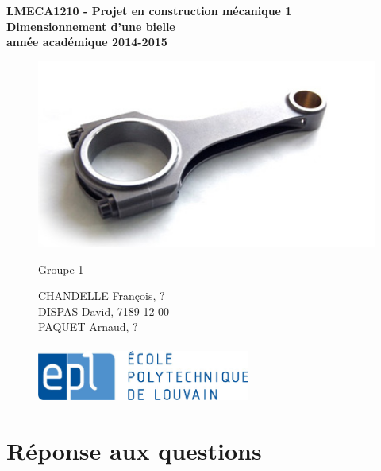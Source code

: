 \documentclass[a4paper,oneside,12pt]{report}
\begin{document}
\begin{titlepage}
\hfill

\begin{center}
\Huge
\textbf{LMECA1210 - Projet en construction mécanique 1\\}
\vspace{0.5cm}
\huge
\textbf{Dimensionnement d'une bielle\\}
\Large
\vspace{0.5cm}
\textbf{année académique 2014-2015\\}
\vspace{0.5cm}
\begin{figure}[b!]
	\center
	\includegraphics[width=12cm]{bielle.jpg}
\end{figure}

\end{center}
\begin{figure}[b!]
\begin{Large}
	Groupe 1\\
\end{Large}
	CHANDELLE François, ?\\
	DISPAS David, 7189-12-00\\
	PAQUET Arnaud, ?\\
	\\
	\newline
	\center
	\includegraphics[width=7cm]{epl-logo.jpg}
\end{figure}
\end{titlepage}


\chapter{Réponse aux questions}
\end{document}
